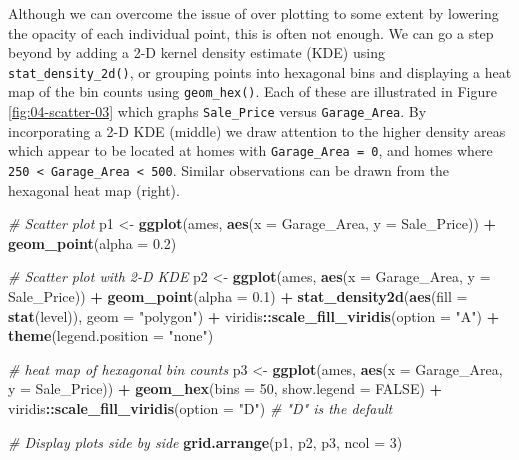 \documentclass[]{book}
\newenvironment{Shaded}{\begin{snugshade}}{\end{snugshade}}
\newcommand{\CommentTok}[1]{\textcolor[rgb]{0.56,0.35,0.01}{\textit{#1}}}
\newcommand{\DataTypeTok}[1]{\textcolor[rgb]{0.13,0.29,0.53}{#1}}
\newcommand{\DecValTok}[1]{\textcolor[rgb]{0.00,0.00,0.81}{#1}}
\newcommand{\FloatTok}[1]{\textcolor[rgb]{0.00,0.00,0.81}{#1}}
\newcommand{\KeywordTok}[1]{\textcolor[rgb]{0.13,0.29,0.53}{\textbf{#1}}}
\newcommand{\NormalTok}[1]{#1}
\newcommand{\OperatorTok}[1]{\textcolor[rgb]{0.81,0.36,0.00}{\textbf{#1}}}
\newcommand{\OtherTok}[1]{\textcolor[rgb]{0.56,0.35,0.01}{#1}}
\newcommand{\StringTok}[1]{\textcolor[rgb]{0.31,0.60,0.02}{#1}}
\theoremstyle{definition}
\theoremstyle{definition}
\theoremstyle{definition}
\theoremstyle{remark}
\begin{document}
Although we can overcome the issue of over plotting to some extent by
lowering the opacity of each individual point, this is often not enough.
We can go a step beyond by adding a 2-D kernel density estimate (KDE)
using \texttt{stat\_density\_2d()}, or grouping points into hexagonal
bins and displaying a heat map of the bin counts using
\texttt{geom\_hex()}. Each of these are illustrated in Figure
\ref{fig:04-scatter-03} which graphs \texttt{Sale\_Price} versus
\texttt{Garage\_Area}. By incorporating a 2-D KDE (middle) we draw
attention to the higher density areas which appear to be located at
homes with \texttt{Garage\_Area\ =\ 0}, and homes where
\texttt{250\ \textless{}\ Garage\_Area\ \textless{}\ 500}. Similar
observations can be drawn from the hexagonal heat map (right).

\begin{Shaded}
\begin{Highlighting}[]
\CommentTok{# Scatter plot}
\NormalTok{p1 <-}\StringTok{ }\KeywordTok{ggplot}\NormalTok{(ames, }\KeywordTok{aes}\NormalTok{(}\DataTypeTok{x =}\NormalTok{ Garage_Area, }\DataTypeTok{y =}\NormalTok{ Sale_Price)) }\OperatorTok{+}\StringTok{ }
\StringTok{  }\KeywordTok{geom_point}\NormalTok{(}\DataTypeTok{alpha =} \FloatTok{0.2}\NormalTok{)}

\CommentTok{# Scatter plot with 2-D KDE}
\NormalTok{p2 <-}\StringTok{ }\KeywordTok{ggplot}\NormalTok{(ames, }\KeywordTok{aes}\NormalTok{(}\DataTypeTok{x =}\NormalTok{ Garage_Area, }\DataTypeTok{y =}\NormalTok{ Sale_Price)) }\OperatorTok{+}\StringTok{ }
\StringTok{  }\KeywordTok{geom_point}\NormalTok{(}\DataTypeTok{alpha =} \FloatTok{0.1}\NormalTok{) }\OperatorTok{+}
\StringTok{  }\KeywordTok{stat_density2d}\NormalTok{(}\KeywordTok{aes}\NormalTok{(}\DataTypeTok{fill =} \KeywordTok{stat}\NormalTok{(level)), }\DataTypeTok{geom =} \StringTok{"polygon"}\NormalTok{) }\OperatorTok{+}
\StringTok{  }\NormalTok{viridis}\OperatorTok{::}\KeywordTok{scale_fill_viridis}\NormalTok{(}\DataTypeTok{option =} \StringTok{"A"}\NormalTok{) }\OperatorTok{+}
\StringTok{  }\KeywordTok{theme}\NormalTok{(}\DataTypeTok{legend.position =} \StringTok{"none"}\NormalTok{)}

\CommentTok{# heat map of hexagonal bin counts}
\NormalTok{p3 <-}\StringTok{ }\KeywordTok{ggplot}\NormalTok{(ames, }\KeywordTok{aes}\NormalTok{(}\DataTypeTok{x =}\NormalTok{ Garage_Area, }\DataTypeTok{y =}\NormalTok{ Sale_Price)) }\OperatorTok{+}\StringTok{ }
\StringTok{  }\KeywordTok{geom_hex}\NormalTok{(}\DataTypeTok{bins =} \DecValTok{50}\NormalTok{, }\DataTypeTok{show.legend =} \OtherTok{FALSE}\NormalTok{) }\OperatorTok{+}
\StringTok{  }\NormalTok{viridis}\OperatorTok{::}\KeywordTok{scale_fill_viridis}\NormalTok{(}\DataTypeTok{option =} \StringTok{"D"}\NormalTok{)  }\CommentTok{# "D" is the default}

\CommentTok{# Display plots side by side}
\KeywordTok{grid.arrange}\NormalTok{(p1, p2, p3, }\DataTypeTok{ncol =} \DecValTok{3}\NormalTok{)}
\end{Highlighting}
\end{Shaded}
\end{document}
